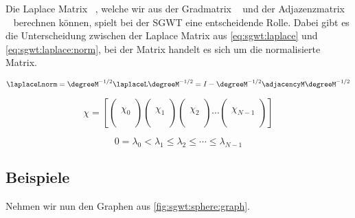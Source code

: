 

Die Laplace Matrix 
\laplaceL~\cite{noauthor_laplace-matrix_2017}, welche wir aus der 
Gradmatrix \degreeM~\cite{noauthor_degree_2018} und der Adjazenzmatrix 
\adjacencyM~\cite{noauthor_adjacency_2019} berechnen k\"onnen, spielt bei der 
SGWT eine entscheidende Rolle. Dabei gibt es 
die Unterscheidung zwischen der Laplace Matrix aus \cref{eq:sgwt:laplace} und 
\cref{eq:sgwt:laplace:norm}, bei der \laplaceLnorm{} Matrix handelt es sich um 
die normalisierte \laplaceL{} Matrix.

\begin{equation}
\laplaceLnorm
= \degreeM^{-1/2}\laplaceL\degreeM^{-1/2}
= I - \degreeM^{-1/2}\adjacencyM\degreeM^{-1/2}
\label{eq:sgwt:laplace:norm}
\end{equation}

\begin{equation}
\chi = 
\left[
\begin{pmatrix}\\\chi_0\\\\\end{pmatrix}
\begin{pmatrix}\\\chi_1\\\\\end{pmatrix}
\begin{pmatrix}\\\chi_2\\\\\end{pmatrix}
\cdots
\begin{pmatrix}\\\chi_{N-1}\\\\\end{pmatrix}
\right]
\end{equation}

\begin{equation}
0 = \lambda_0 < \lambda_1 \le \lambda_2 \le \cdots \le \lambda_{N-1}
\end{equation}

\subsection{Beispiele}

Nehmen wir nun den Graphen aus \cref{fig:sgwt:sphere:graph}.

